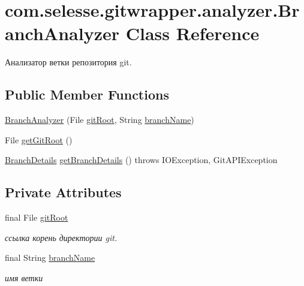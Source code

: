 \hypertarget{classcom_1_1selesse_1_1gitwrapper_1_1analyzer_1_1_branch_analyzer}{}\section{com.\+selesse.\+gitwrapper.\+analyzer.\+Branch\+Analyzer Class Reference}
\label{classcom_1_1selesse_1_1gitwrapper_1_1analyzer_1_1_branch_analyzer}


Анализатор ветки репозитория git.  


\subsection*{Public Member Functions}
\begin{DoxyCompactItemize}
\item 
\hyperlink{classcom_1_1selesse_1_1gitwrapper_1_1analyzer_1_1_branch_analyzer_a957c34c5a1aaf045a409e23f468ad7bd}{Branch\+Analyzer} (File \hyperlink{classcom_1_1selesse_1_1gitwrapper_1_1analyzer_1_1_branch_analyzer_a22ce9222e8e09548e792ca81df39930e}{git\+Root}, String \hyperlink{classcom_1_1selesse_1_1gitwrapper_1_1analyzer_1_1_branch_analyzer_a56a4611177f490a67456c950ef7f3272}{branch\+Name})
\item 
File \hyperlink{classcom_1_1selesse_1_1gitwrapper_1_1analyzer_1_1_branch_analyzer_a6226073e5c8a4645aadafbc815bf7edc}{get\+Git\+Root} ()
\item 
\hyperlink{classcom_1_1selesse_1_1gitwrapper_1_1analyzer_1_1_branch_details}{Branch\+Details} \hyperlink{classcom_1_1selesse_1_1gitwrapper_1_1analyzer_1_1_branch_analyzer_a1ebfd0404a1d761dbda86268a08cc329}{get\+Branch\+Details} ()  throws I\+O\+Exception, Git\+A\+P\+I\+Exception 
\end{DoxyCompactItemize}
\subsection*{Private Attributes}
\begin{DoxyCompactItemize}
\item 
final File \hyperlink{classcom_1_1selesse_1_1gitwrapper_1_1analyzer_1_1_branch_analyzer_a22ce9222e8e09548e792ca81df39930e}{git\+Root}
\begin{DoxyCompactList}\small\item\em ссылка корень директории git. \end{DoxyCompactList}\item 
final String \hyperlink{classcom_1_1selesse_1_1gitwrapper_1_1analyzer_1_1_branch_analyzer_a56a4611177f490a67456c950ef7f3272}{branch\+Name}
\begin{DoxyCompactList}\small\item\em имя ветки \end{DoxyCompactList}\end{DoxyCompactItemize}
